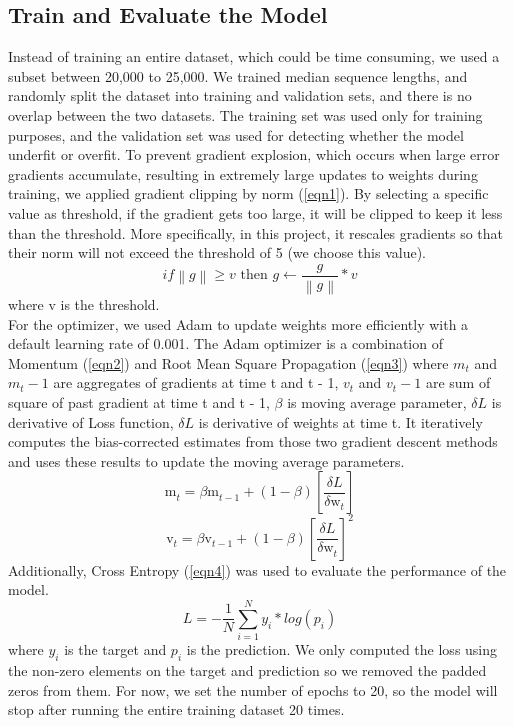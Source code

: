\documentclass[conference]{IEEEtran}
\begin{document}
\subsection{Train and Evaluate the Model}
Instead of training an entire dataset, which could be time consuming, we used a subset between 20,000 to 25,000. We trained median sequence lengths, and randomly split the dataset into training and validation sets, and there is no overlap between the two datasets. The training set was used only for training purposes, and the validation set was used for detecting whether the model underfit or overfit. To prevent gradient explosion, which occurs when large error gradients accumulate, resulting in extremely large updates to weights during training, we applied gradient clipping by norm (\ref{eqn1}). By selecting a specific value as threshold, if the gradient gets too large, it will be clipped to keep it less than the threshold. More specifically, in this project, it rescales gradients so that their norm will not exceed the threshold of 5 (we choose this value).
\begin{equation}
    \label{eqn1}
    if \left\| g \right\| \ge v \text{ then } g \gets \frac{g}{\left\| g \right\|}*v
\end{equation}    
where v is the threshold. \\
For the optimizer, we used Adam to update weights more efficiently with a default learning rate of 0.001.
The Adam optimizer is a combination of Momentum (\ref{eqn2}) and Root Mean Square Propagation (\ref{eqn3}) where $m_t$ and $m_t-1$ are aggregates of gradients at time t and t - 1, $v_t$ and $v_t-1$ are sum of square of past gradient at time t and t - 1, $\beta$ is moving average parameter, $\delta L$ is derivative of Loss function, $\delta L$ is derivative of weights at time t. It iteratively computes the bias-corrected estimates from those two gradient descent methods and uses these results to update the moving average parameters.
\begin{equation}
    \label{eqn2}
    \mathrm{m}_{t}^{} = \beta\mathrm{m}_{t-1}^{} + (1-\beta)\left[ \frac{\delta L}{\delta \mathrm{w}_{t}^{}} \right]
\end{equation}    
\begin{equation}
    \label{eqn3}
    \mathrm{v}_{t}^{} = \beta\mathrm{v}_{t-1}^{} + (1-\beta)\left[ \frac{\delta L}{\delta \mathrm{w}_{t}^{}} \right]^2
\end{equation}    
 Additionally, Cross Entropy (\ref{eqn4}) was used to evaluate the performance of the model. 
\begin{equation}
    \label{eqn4}
    L = - \dfrac{1}{N} \sum_{i = 1}^{N} y_i * log(p_i)
\end{equation}    
where $y_i$ is the target and $p_i$ is the prediction. We only computed the loss using the non-zero elements on the target and prediction so we removed the padded zeros from them. 
For now, we set the number of epochs to 20, so the model will stop after running the entire training dataset 20 times.  \\ 
\end{document}
